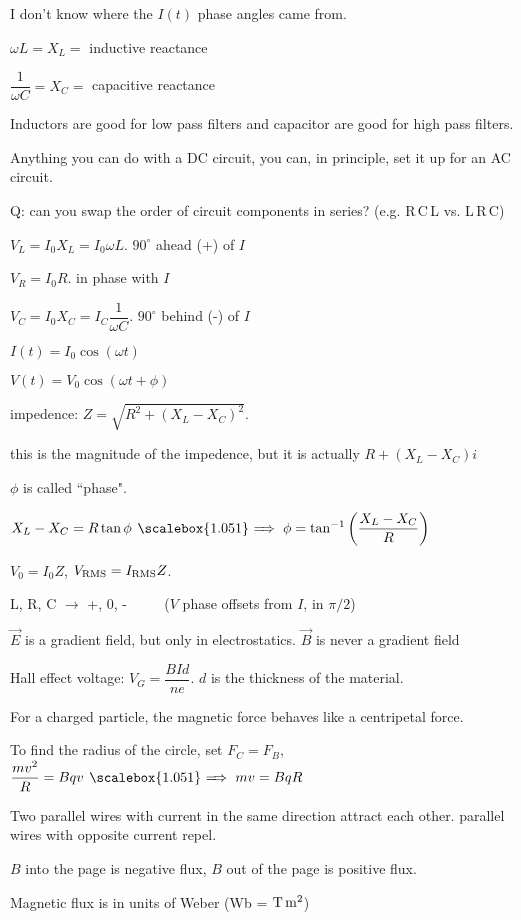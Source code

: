 \documentclass[12pt]{article}
\newcommand \hpx [1]{\hspace{#1px}}
\newcommand \nhpx [1]{\hspace{-#1px}}
\renewcommand \implies {\hpx 4 \raisebox{-0.14px}{\scalebox{1.051} =} \nhpx{5.2} \Rightarrow \hpx 3}
\begin{document}
I don't know where the $I(t)$ phase angles came from.

$\omega L = X_L = $ inductive reactance

$\dfrac 1 {\omega C} = X_C = $ capacitive reactance

\newpage

Inductors are good for low pass filters and capacitor are good for high pass filters.

Anything you can do with a DC circuit, you can, in principle, set it up for an AC circuit.

Q: can you swap the order of circuit components in series? (e.g. R\,C\,L vs. L\,R\,C)

$V_L = I_0 X_L = I_0 \omega L$. $90^\circ$ ahead (+) of $I$

$V_R = I_0 R$. in phase with $I$

$V_C = I_0 X_C = I_C \dfrac 1 {\omega C}$. $90^\circ$ behind (-) of $I$

$I(t) = I_0 \cos (\omega t)$

$V(t) = V_0 \cos(\omega t + \phi)$

impedence: $Z = \sqrt{R^2 + (X_L - X_C)^2}$.

this is the magnitude of the impedence, but it is actually $R + (X_L - X_C) i$

$\phi$ is called ``phase".

$X_L - X_C = R \tan \phi \implies \phi = \tan^{-1}\left(\dfrac{X_L - X_C} R\right)$

$V_0 = I_0 Z$, $V_{\rm RMS} = I_{\rm RMS} Z$.

L, R, C $\longrightarrow$ +, 0, - ~~~~ ($V$ phase offsets from $I$, in $\pi/2$)

$\vec E$ is a gradient field, but only in electrostatics. $\vec B$ is never a gradient field

Hall effect voltage: $V_G = \dfrac {B I d} {n e}$. $d$ is the thickness of the material.

For a charged particle, the magnetic force behaves like a centripetal force.

To find the radius of the circle, set $F_C = F_B$,
$\dfrac {m v^2} R = B q v \implies m v = B q R$

Two parallel wires with current in the same direction attract each other.
parallel wires with opposite current repel.

$B$ into the page is negative flux, $B$ out of the page is positive flux.

Magnetic flux is in units of Weber (Wb = ${\rm T}\,{\rm m}^2$)
\end{document}

